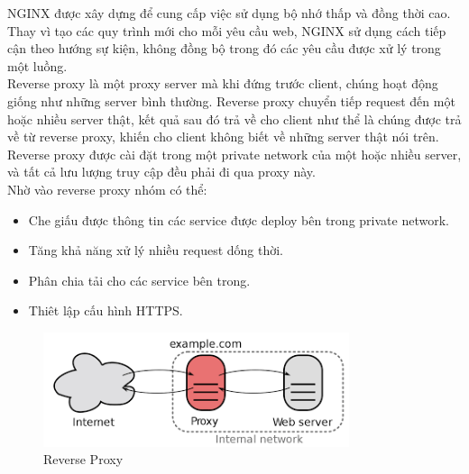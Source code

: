             NGINX được xây dựng để cung cấp việc sử dụng bộ nhớ thấp và đồng thời cao. Thay vì tạo các quy trình mới cho mỗi yêu cầu web, NGINX sử dụng cách tiếp cận theo hướng sự kiện, không đồng bộ trong đó các yêu cầu được xử lý trong một luồng.\\
            
            Reverse proxy là một proxy server mà khi đứng trước client, chúng hoạt động giống như những server bình thường. Reverse proxy chuyển tiếp request đến một hoặc nhiều server thật, kết quả sau đó trả về cho client như thể là chúng được trả về từ reverse proxy, khiến cho client không biết về những server thật nói trên. Reverse proxy được cài đặt trong một private network của một hoặc nhiều server, và tất cả lưu lượng truy cập đều phải đi qua proxy này.\\
            
            Nhờ vào reverse proxy nhóm có thể:
            
            \begin{itemize}
                \item Che giấu được thông tin các service được deploy bên trong private network.
                \item Tăng khả năng xử lý nhiều request dống thời.
                \item Phân chia tải cho các service bên trong.
                \item Thiêt lập cấu hình HTTPS.
            \end{itemize}
        
	        \begin{figure}[H]  			
	        	\includegraphics[width=0.8\textwidth]{Images/reverseproxy.png}
	        	\centering
	        	\linebreak
	        	\caption{Reverse Proxy}
	        \end{figure}
          
            
            
            
            
            
		